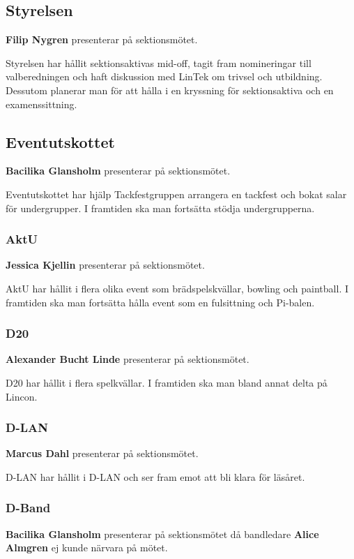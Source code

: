 \documentclass[../protokoll-vintermote-2024.tex]{subfiles}
\begin{document}
\subsection{Styrelsen}
\textbf{Filip Nygren} presenterar på sektionsmötet. 
 
Styrelsen har hållit sektionsaktivas mid-off, tagit fram nomineringar till valberedningen och haft diskussion med LinTek om trivsel och utbildning. Dessutom planerar man för att hålla i en kryssning för sektionsaktiva och en examenssittning.

\subsection{Eventutskottet}
\textbf{Bacilika Glansholm} presenterar på sektionsmötet.

Eventutskottet har hjälp Tackfestgruppen arrangera en tackfest och bokat salar för undergrupper. I framtiden ska man fortsätta stödja undergrupperna.

\subsubsection{AktU}
\textbf{Jessica Kjellin} presenterar på sektionsmötet.

AktU har hållit i flera olika event som brädspelskvällar, bowling och paintball. I framtiden ska man fortsätta hålla event som en fulsittning och Pi-balen.

\subsubsection{D20}
\textbf{Alexander Bucht Linde} presenterar på sektionsmötet. 

D20 har hållit i flera spelkvällar. I framtiden ska man bland annat delta på Lincon.

\subsubsection{D-LAN}
\textbf{Marcus Dahl} presenterar på sektionsmötet. 

D-LAN har hållit i D-LAN och ser fram emot att bli klara för läsåret.

\subsubsection{D-Band}
\textbf{Bacilika Glansholm} presenterar på sektionsmötet då bandledare \textbf{Alice Almgren} ej kunde närvara på mötet. 
\end{document}
